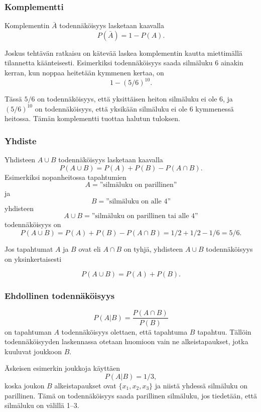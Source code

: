 \subsubsection{Komplementti}

Komplementin $\bar A$
todennäköisyys lasketaan kaavalla
\[P(\bar A)=1-P(A).\]

Joskus tehtävän ratkaisu on kätevää
laskea komplementin kautta
miettimällä tilannetta käänteisesti.
Esimerkiksi todennäköisyys saada
silmäluku 6 ainakin kerran,
kun noppaa heitetään kymmenen kertaa, on
\[1-(5/6)^{10}.\]

Tässä $5/6$ on todennäköisyys,
että yksittäisen heiton silmäluku ei ole 6,
ja $(5/6)^{10}$ on todennäköisyys, että yksikään
silmäluku ei ole 6 kymmenessä heitossa.
Tämän komplementti tuottaa halutun tuloksen.

\subsubsection{Yhdiste}

Yhdisteen $A \cup B$ todennäköisyys lasketaan kaavalla 
\[P(A \cup B)=P(A)+P(B)-P(A \cap B).\]
Esimerkiksi nopanheitossa tapahtumien
\[A=\textrm{''silmäluku on parillinen''}\]
ja
\[B=\textrm{''silmäluku on alle 4''}\]
yhdisteen
\[A \cup B=\textrm{''silmäluku on parillinen tai alle 4''}\]
todennäköisyys on
\[P(A \cup B) = P(A)+P(B)-P(A \cap B)=1/2+1/2-1/6=5/6.\]

Jos tapahtumat $A$ ja $B$ ovat  eli $A \cap B$ on tyhjä,
yhdisteen $A \cup B$ todennäköisyys on yksinkertaisesti

\[P(A \cup B)=P(A)+P(B).\]

\subsubsection{Ehdollinen todennäköisyys}


\[P(A | B) = \frac{P(A \cap B)}{P(B)}\]
on tapahtuman $A$ todennäköisyys
olettaen, että tapahtuma $B$ tapahtuu.
Tällöin todennäköisyyden laskennassa otetaan
huomioon vain ne alkeistapaukset,
jotka kuuluvat joukkoon $B$.

Äskeisen esimerkin joukkoja käyttäen
\[P(A | B)= 1/3,\]
koska joukon $B$ alkeistapaukset ovat
$\{x_1,x_2,x_3\}$ ja niistä yhdessä
silmäluku on parillinen.
Tämä on todennäköisyys saada parillinen silmäluku,
jos tiedetään, että silmäluku on välillä 1--3.

